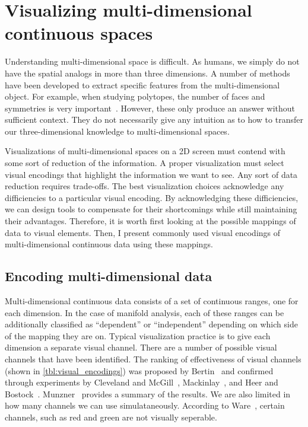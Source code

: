 
\section{Visualizing multi-dimensional continuous spaces}
\label{sec:multi-d-challenges}

Understanding multi-dimensional space is difficult. As humans, we simply do not
have the spatial analogs in more than three dimensions. A number of methods
have been developed to extract specific features from the multi-dimensional
object. For example, when studying polytopes, the number of faces and
symmetries is very important~\cite{Ziegler:2012}. However, these only produce
an answer without sufficient context. They do not necessarily give any
intuition as to how to transfer our three-dimensional knowledge to
multi-dimensional spaces.


Visualizations of multi-dimensional spaces on a 2D screen must contend with
some sort of reduction of the information. A proper visualization must select
visual encodings that highlight the information we want to see. Any sort of
data reduction requires trade-offs. The best visualization choices acknowledge
any difficiencies to a particular visual encoding. By acknowledging these
difficiencies, we can design tools to compensate for their shortcomings while
still maintaining their advantages. Therefore, it is worth first looking at the
possible mappings of data to visual elements. Then, I present commonly used
visual encodings of multi-dimensional continuous data using these mappings.

\subsection{Encoding multi-dimensional data}

Multi-dimensional continuous data consists of a set of continuous ranges, one
for each dimension. In the case of manifold analysis, each of these ranges can
be additionally classified as ``dependent'' or ``independent'' depending on
which side of the mapping they are on. Typical visualization practice is to
give each dimension a separate visual channel. There are a number of possible
visual channels that have been identified.  The ranking of effectiveness of
visual channels (shown in \autoref{tbl:visual_encodings}) was proposed by
Bertin~\cite{Bertin:1967} and confirmed through experiments by Cleveland and
McGill~\cite{Cleveland:1984}, Mackinlay~\cite{Mackinlay:1986}, and Heer and
Bostock~\cite{Heer:2010}.  Munzner~\cite{Munzner:2014} provides a summary of
the results. We are also limited in how many channels we can use
simulataneously. According to Ware~\cite{Ware:2004}, certain channels, such as
red and green are not visually seperable. 

